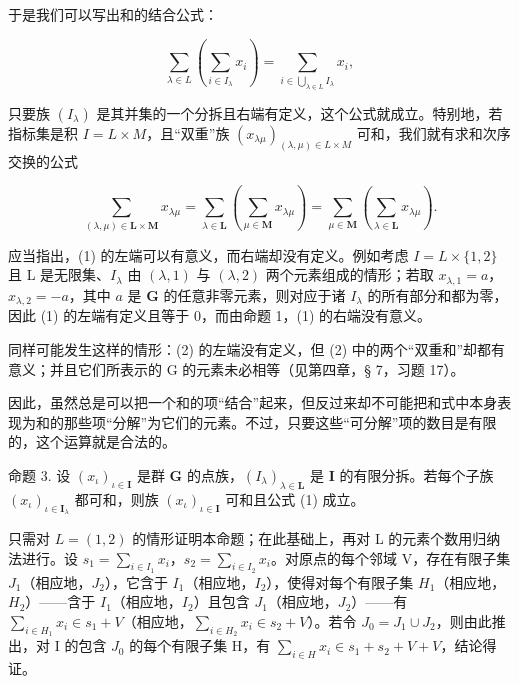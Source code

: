 于是我们可以写出和的结合公式：

\[
\sum_ {\lambda \in L} (\sum_ {i \in I _ {\lambda}} x _ {i}) = \sum_ {i \in \bigcup_ {\lambda \in L} I _ {\lambda}} x _ {i},\tag{1}
\]

只要族 \((I_{\lambda})\) 是其并集的一个分拆且右端有定义，这个公式就成立。特别地，若指标集是积 \(I = L \times M\)，且“双重”族 \((x_{\lambda\mu})_{(\lambda,\mu) \in L \times M}\) 可和，我们就有求和次序交换的公式

\[
\sum_ {(\lambda , \mu) \in \mathbf {L} \times \mathbf {M}} x _ {\lambda \mu} = \sum_ {\lambda \in \mathbf {L}} (\sum_ {\mu \in \mathbf {M}} x _ {\lambda \mu}) = \sum_ {\mu \in \mathbf {M}} (\sum_ {\lambda \in \mathbf {L}} x _ {\lambda \mu}).\tag{2}
\]

应当指出，(1) 的左端可以有意义，而右端却没有定义。例如考虑 \(I = L \times \{1, 2\}\) 且 L 是无限集、\(I_{\lambda}\) 由 \((\lambda, 1)\) 与 \((\lambda, 2)\) 两个元素组成的情形；若取 \(x_{\lambda,1} = a\)，\(x_{\lambda,2} = -a\)，其中 \(a\) 是 \(\mathbf{G}\) 的任意非零元素，则对应于诸 \(I_{\lambda}\) 的所有部分和都为零，因此 (1) 的左端有定义且等于 0，而由命题 1，(1) 的右端没有意义。

同样可能发生这样的情形：(2) 的左端没有定义，但 (2) 中的两个“双重和”却都有意义；并且它们所表示的 G 的元素未必相等（见第四章，§ 7，习题 17）。

因此，虽然总是可以把一个和的项“结合”起来，但反过来却不可能把和式中本身表现为和的那些项“分解”为它们的元素。不过，只要这些“可分解”项的数目是有限的，这个运算就是合法的。

命题 3. 设 \((x_{\iota})_{\iota \in \mathbf{I}}\) 是群 \(\mathbf{G}\) 的点族，\((I_{\lambda})_{\lambda \in \mathbf{L}}\) 是 \(\mathbf{I}\) 的有限分拆。若每个子族 \((x_{\iota})_{\iota \in \mathbf{I}_{\lambda}}\) 都可和，则族 \((x_{\iota})_{\iota \in \mathbf{I}}\) 可和且公式 (1) 成立。

只需对 \(L = (1,2)\) 的情形证明本命题；在此基础上，再对 L 的元素个数用归纳法进行。设 \(s_{1} = \sum_{i \in I_{1}} x_{i}\)，\(s_{2} = \sum_{i \in I_{2}} x_{i}\)。对原点的每个邻域 V，存在有限子集 \(J_{1}\)（相应地，\(J_{2}\)），它含于 \(I_{1}\)（相应地，\(I_{2}\)），使得对每个有限子集 \(H_{1}\)（相应地，\(H_{2}\)）——含于 \(I_{1}\)（相应地，\(I_{2}\)）且包含 \(J_{1}\)（相应地，\(J_{2}\)）——有 \(\sum_{i \in H_{1}} x_{i} \in s_{1} + V\)（相应地，\(\sum_{i \in H_{2}} x_{i} \in s_{2} + V\)）。若令 \(J_{0} = J_{1} \cup J_{2}\)，则由此推出，对 I 的包含 \(J_{0}\) 的每个有限子集 H，有 \(\sum_{i \in H} x_{i} \in s_{1} + s_{2} + V + V\)，结论得证。

